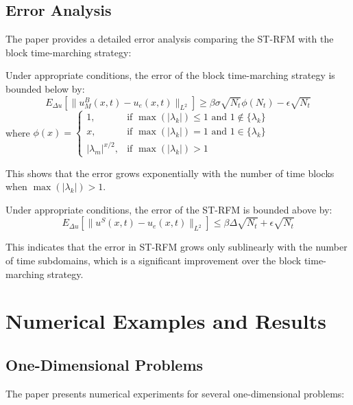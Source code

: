 \documentclass[11pt]{article}
\begin{document}
\subsection{Error Analysis}

The paper provides a detailed error analysis comparing the ST-RFM with the block time-marching strategy:

\begin{theorem}
Under appropriate conditions, the error of the block time-marching strategy is bounded below by:
\begin{equation}
E_{\Delta u}[\|u^B_M(x,t) - u_e(x,t)\|_{L^2}] \geq \beta \sigma \sqrt{N_t} \phi(N_t) - \epsilon\sqrt{N_t}
\end{equation}
where $\phi(x) = 
\begin{cases}
1, & \text{if } \max(|\lambda_k|) \leq 1 \text{ and } 1 \not\in \{\lambda_k\} \\
x, & \text{if } \max(|\lambda_k|) = 1 \text{ and } 1 \in \{\lambda_k\} \\
|\lambda_m|^{x/2}, & \text{if } \max(|\lambda_k|) > 1
\end{cases}$
\end{theorem}

This shows that the error grows exponentially with the number of time blocks when $\max(|\lambda_k|) > 1$.

\begin{theorem}
Under appropriate conditions, the error of the ST-RFM is bounded above by:
\begin{equation}
E_{\Delta u}[\|u^S(x,t) - u_e(x,t)\|_{L^2}] \leq \beta \Delta \sqrt{N_t} + \epsilon\sqrt{N_t}
\end{equation}
\end{theorem}

This indicates that the error in ST-RFM grows only sublinearly with the number of time subdomains, which is a significant improvement over the block time-marching strategy.

\section{Numerical Examples and Results}

\subsection{One-Dimensional Problems}

The paper presents numerical experiments for several one-dimensional problems:
\end{document}
